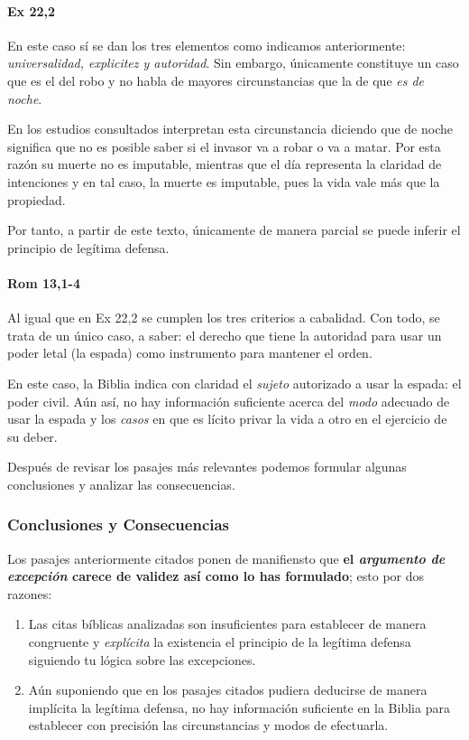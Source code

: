 \documentclass{article}
\begin{document}
\paragraph{Ex 22,2}

En este caso s\'{i} se dan los tres elementos como indicamos anteriormente: \emph{universalidad, explicitez y autoridad}. Sin embargo, \'unicamente constituye un caso que es el del robo y no habla de mayores circunstancias que la de que \emph{es de noche}.

En los estudios consultados interpretan esta circunstancia diciendo que de noche significa que no es posible saber si el invasor va a robar o va a matar. Por esta raz\'on su muerte no es imputable, mientras que el d\'{i}a representa la claridad de intenciones y en tal caso, la muerte es imputable, pues la vida vale m\'as que la propiedad.

Por tanto, a partir de este texto, \'unicamente de manera parcial se puede inferir el principio de leg\'{i}tima defensa.

\paragraph{Rom 13,1-4}

Al igual que en Ex 22,2 se cumplen los tres criterios a cabalidad. Con todo, se trata de un \'unico caso, a saber: el derecho que tiene la autoridad para usar un poder letal (la espada) como instrumento para mantener el orden.

En este caso, la Biblia indica con claridad el \emph{sujeto} autorizado a usar la espada: el poder civil. A\'un as\'{i}, no hay informaci\'on suficiente acerca del \emph{modo} adecuado de usar la espada y los \emph{casos} en que es l\'{i}cito privar la vida a otro en el ejercicio de su deber.

Despu\'es de revisar los pasajes m\'as relevantes podemos formular algunas conclusiones y analizar las consecuencias.

\subsubsection{Conclusiones y Consecuencias}

Los pasajes anteriormente citados ponen de manifiensto que \textbf{el \emph{argumento de excepci\'on} carece de validez as\'{i} como lo has formulado}; esto por dos razones:

\begin{enumerate}
\item Las citas b\'{i}blicas analizadas son insuficientes para establecer de manera congruente y \emph{expl\'{i}cita} la existencia el principio de la leg\'{i}tima defensa siguiendo tu l\'ogica sobre las excepciones.
\item A\'un suponiendo que en los pasajes citados pudiera deducirse de manera impl\'{i}cita la leg\'{i}tima defensa, no hay informaci\'on suficiente en la Biblia para establecer con precisi\'on las circunstancias y modos de efectuarla.
\end{enumerate}
\end{document}
